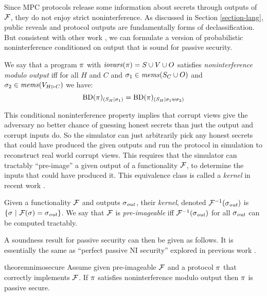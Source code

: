 Since MPC protocols release some information about secrets through
outputs of $\mathcal{F}$, they do not enjoy strict noninterference.  As
discussed in Section \ref{section-lang}, public reveals and protocol
outputs are fundamentally forms of declassification.  But consistent
with other work \cite{8429300}, we can formulate a version of
probabilistic noninterference conditioned on output that is sound
for passive security. 
\begin{definition}
  \label{definition-NIMO}
  We say that a program $\pi$ with $\mathit{iovars}(\pi) = S \cup V \cup O$
  satisfies \emph{noninterference modulo output}
  iff for all $H$ and $C$ and $\sigma_1 \in \mathit{mems}(S_C \cup O)$ and $\sigma_2 \in \mathit{mems}(V_{H \rhd C})$
  we have:
  $$
  \mathrm{BD}(\pi)_{({S_H}|{\sigma_1})} = \mathrm{BD}(\pi)_{({S_H}|{\sigma_1 \uplus \sigma_2})}
 $$
\end{definition}
This conditional noninterference property implies that
corrupt views give the adversary no better chance of guessing honest
secrets than just the output and corrupt inputs do. So the simulator
can just arbitrarily pick any honest secrets that could have produced
the given outputs and run the protocol in simulation to reconstruct
real world corrupt views. This requires that the simulator can
tractably ``pre-image'' a given output of a functionality $\mathcal{F}$,
to determine the inputs that could have produced it. This equivalence
class is called a \emph{kernel} in recent work \cite{10.1145/3571740}.
\begin{definition}
  Given a functionality $\mathcal{F}$ and outputs $\sigma_{\mathit{out}}$, their 
  \emph{kernel}, denoted $\mathcal{F}^{-1}(\sigma_{\mathit{out}})$ is
  $
  \{ \sigma\ |\ \mathcal{F}(\sigma) = \sigma_{\mathit{out}} \}
  $.
  We say that $\mathcal{F}$ is \emph{pre-imageable} iff $\mathcal{F}^{-1}(\sigma_{\mathit{out}})$ for all
  $\sigma_{\mathit{out}}$ can be computed tractably.
\end{definition}
A soundness result for passive security can then be given as follows.
It is essentially the same as ``perfect passive NI security'' explored
in previous work \cite{8429300}.  
\begin{restatable}{theorem}{nimosecure}
  \label{theorem-nimo}
  Assume given pre-imageable $\mathcal{F}$ and a protocol $\pi$ that
  correctly implements $\mathcal{F}$.  If $\pi$ satisfies noninterference modulo output
  then $\pi$ is passive secure.
\end{restatable}


